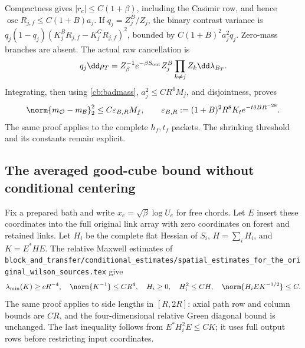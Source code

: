 Compactness gives \(|r_c|\le C(1+\beta)\), including the Casimir row, and hence \(\operatorname{osc}R_{j,f}\le C(1+B)a_j\). If \(q_j=Z_j^B/Z_j\), the binary contrast variance is
\(q_j(1-q_j)(K_j^BR_{j,f}-K_j^GR_{j,f})^2\), bounded by \(C(1+B)^2a_j^2q_j\). Zero-mass branches are absent. The actual raw cancellation is
\[
 q_j\dd\rho_T
 =Z_\beta^{-1}e^{-\beta S_{\rm out}}
       Z_j^B\prod_{k\ne j}Z_k\dd\lambda_{B_T}.
\]
Integrating, then using \eqref{cb:badmass}, \(a_j^2\le CR^4M_j\), and disjointness, proves
\begin{equation}
 \norm{m_{\mathcal O}-m_{\mathcal B}}_2^2
 \le C\varepsilon_{B,R}M_f,\qquad
 \varepsilon_{B,R}:=(1+B)^2R^8K_t e^{-t\delta BR^{-28}}.
 \label{cb:labels}
\end{equation}
The same proof applies to the complete \(h_f,t_f\) packets. The shrinking threshold and its constants remain explicit.

\subsection{The averaged good-cube bound without conditional centering}

Fix a prepared bath and write \(x_e=\sqrt\beta\log U_e\) for free chords. Let \(E\) insert these coordinates into the full original link array with zero coordinates on forest and retained links. Let \(H_i\) be the complete flat Hessian of \(S_i\), \(H=\sum_iH_i\), and \(K=E^*HE\). The relative Maxwell estimates of \texttt{block\_and\_transfer/conditional\_estimates/spatial\_estimates\_for\_the\_original\_wilson\_sources.tex} give
\begin{equation}
 \lambda_{\min}(K)\ge cR^{-4},\quad \norm{K^{-1}}\le CR^4,
 \quad H_i\ge0,\quad H_i^2\le CH,
 \quad\norm{H_iEK^{-1/2}}\le C.
 \label{cb:matrix}
\end{equation}
The same proof applies to side lengths in \([R,2R]\): axial path row and column bounds are \(CR\), and the four-dimensional relative Green diagonal bound is unchanged. The last inequality follows from \(E^*H_i^2E\le CK\); it uses full output rows before restricting input coordinates.

